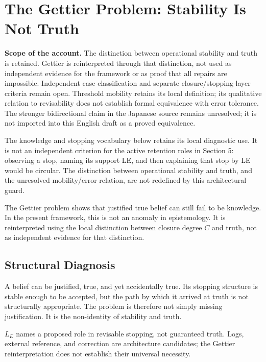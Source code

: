 \section{The Gettier Problem: Stability Is Not Truth}

\noindent\textbf{Scope of the account.} The distinction between operational stability and truth is retained. Gettier is reinterpreted through that distinction, not used as independent evidence for the framework or as proof that all repairs are impossible. Independent case classification and separate closure/stopping-layer criteria remain open. Threshold mobility retains its local definition; its qualitative relation to revisability does not establish formal equivalence with error tolerance. The stronger bidirectional claim in the Japanese source remains unresolved; it is not imported into this English draft as a proved equivalence.

The knowledge and stopping vocabulary below retains its local diagnostic use. It is not an independent criterion for the active retention roles in Section 5: observing a stop, naming its support LE, and then explaining that stop by LE would be circular. The distinction between operational stability and truth, and the unresolved mobility/error relation, are not redefined by this architectural guard.


The Gettier problem shows that justified true belief can still fail to be knowledge. In the present framework, this is not an anomaly in epistemology. It is reinterpreted using the local distinction between closure degree $C$ and truth, not as independent evidence for that distinction.

\subsection{Structural Diagnosis}

A belief can be justified, true, and yet accidentally true. Its stopping structure is stable enough to be accepted, but the path by which it arrived at truth is not structurally appropriate. The problem is therefore not simply missing justification. It is the non-identity of stability and truth.

$L_E$ names a proposed role in revisable stopping, not guaranteed truth. Logs, external reference, and correction are architecture candidates; the Gettier reinterpretation does not establish their universal necessity.

